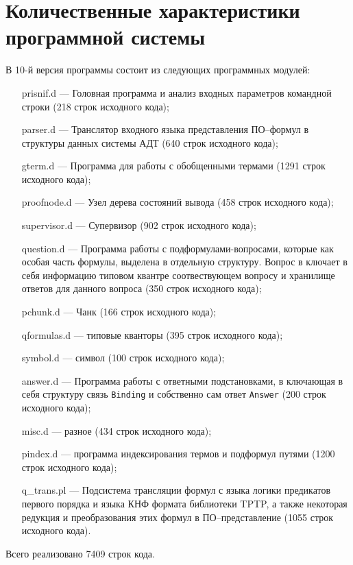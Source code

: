 

\section{Количественные характеристики программной системы}
В 10-й версия программы состоит из следующих программных модулей:
\begin{enumerate}
\item[prisnif.d] --- Головная программа и анализ входных параметров командной строки (218 строк исходного кода);
\item[parser.d] --- Транслятор входного языка представления ПО--формул в структуры данных системы АДТ (640 строк исходного кода);
\item[gterm.d] --- Программа для работы с обобщенными термами (1291 строк исходного кода);
\item[proofnode.d] --- Узел дерева состояний вывода (458 строк исходного кода);
\item[supervisor.d] --- Супервизор (902 строк исходного кода);
\item[question.d] --- Программа работы с подформулами-вопросами, которые как особая часть формулы, выделена в отдельную структуру. Вопрос в ключает в себя информацию типовом квантре соотвествующем вопросу и хранилище ответов для данного вопроса (350 строк исходного кода);
\item[pchunk.d] --- Чанк (166 строк исходного кода);
\item[qformulas.d] --- типовые кванторы (395 строк исходного кода);
\item[symbol.d] --- символ (100 строк исходного кода);
\item[answer.d] --- Программа работы с ответными подстановками, в ключающая в себя структуру связь \texttt{Binding} и собственно сам ответ \texttt{Answer} (200 строк исходного кода);
\item[misc.d] --- разное (434 строк исходного кода);
\item[pindex.d] --- программа индексирования термов и подформул путями (1200 строк исходного кода);
\item[q\_trans.pl] --- Подсистема трансляции формул с языка логики предикатов первого порядка и языка КНФ формата библиотеки TPTP, а также некоторая редукция и преобразования этих формул в ПО--представление (1055 строк исходного кода).
\end{enumerate}
Всего реализовано 7409 строк кода.

